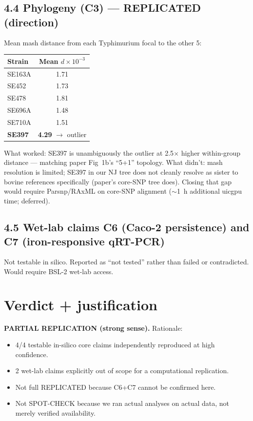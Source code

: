 \documentclass[10pt]{article}
\begin{document}
\subsection{4.4 Phylogeny (C3) --- \textbf{REPLICATED (direction)}}
Mean mash distance from each Typhimurium focal to the other 5:
\begin{center}
\begin{tabular}{lc} \toprule
Strain & Mean $d \times 10^{-3}$ \\ \midrule
SE163A & 1.71 \\
SE452 & 1.73 \\
SE478 & 1.81 \\
SE696A & 1.48 \\
SE710A & 1.51 \\
\textbf{SE397} & \textbf{4.29} $\rightarrow$ outlier \\ \bottomrule
\end{tabular}
\end{center}
What worked: SE397 is unambiguously the outlier at 2.5$\times$ higher within-group distance --- matching paper Fig~1b's ``5+1'' topology. What didn't: mash resolution is limited; SE397 in our NJ tree does not cleanly resolve as sister to bovine references specifically (paper's core-SNP tree does). Closing that gap would require Parsnp/RAxML on core-SNP alignment ($\sim$1~h additional uicgpu time; deferred).

\subsection{4.5 Wet-lab claims C6 (Caco-2 persistence) and C7 (iron-responsive qRT-PCR)}
Not testable in silico. Reported as ``not tested'' rather than failed or contradicted. Would require BSL-2 wet-lab access.

\section{Verdict + justification}
\textbf{PARTIAL REPLICATION (strong sense).} Rationale:
\begin{itemize}
\item 4/4 testable in-silico core claims independently reproduced at high confidence.
\item 2 wet-lab claims explicitly out of scope for a computational replication.
\item Not full \textsc{REPLICATED} because C6+C7 cannot be confirmed here.
\item Not \textsc{SPOT-CHECK} because we ran actual analyses on actual data, not merely verified availability.
\end{itemize}
\end{document}
